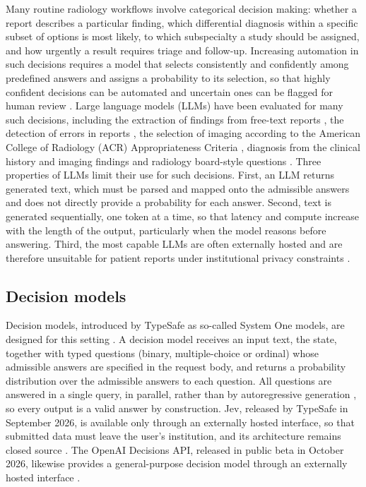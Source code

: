 \documentclass[11pt]{article}
\begin{document}
Many routine radiology workflows involve categorical decision making: whether a report describes a particular finding, which differential diagnosis within a specific subset of options is most likely, to which subspecialty a study should be assigned, and how urgently a result requires triage and follow-up. Increasing automation in such decisions requires a model that selects consistently and confidently among predefined answers and assigns a probability to its selection, so that highly confident decisions can be automated and uncertain ones can be flagged for human review \citep{geifman2017selective}. Large language models (LLMs) have been evaluated for many such decisions, including the extraction of findings from free-text reports \citep{fink2023datamining,mukherjee2023vicuna}, the detection of errors in reports \citep{gertz2024errors}, the selection of imaging according to the American College of Radiology (ACR) Appropriateness Criteria \citep{rau2023accgpt,yao2025radcases}, diagnosis from the clinical history and imaging findings \citep{ueda2023diagnosisplease,tayebiarasteh2025radiorag} and radiology board-style questions \citep{bhayana2023board}. Three properties of LLMs limit their use for such decisions. First, an LLM returns generated text, which must be parsed and mapped onto the admissible answers and does not directly provide a probability for each answer. Second, text is generated sequentially, one token at a time, so that latency and compute increase with the length of the output, particularly when the model reasons before answering. Third, the most capable LLMs are often externally hosted and are therefore unsuitable for patient reports under institutional privacy constraints \citep{mukherjee2023vicuna}.

\subsection{Decision models}\label{sec:intro_dm}

Decision models, introduced by TypeSafe as so-called System One models, are designed for this setting \citep{almeida2026jev}. A decision model receives an input text, the state, together with typed questions (binary, multiple-choice or ordinal) whose admissible answers are specified in the request body, and returns a probability distribution over the admissible answers to each question. All questions are answered in a single query, in parallel, rather than by autoregressive generation \citep{almeida2026jev,typesafe2026api}, so every output is a valid answer by construction. Jev, released by TypeSafe in September 2026, is available only through an externally hosted interface, so that submitted data must leave the user's institution, and its architecture remains closed source \citep{typesafe2026api,hume2026unmasked}. The OpenAI Decisions API, released in public beta in October 2026, likewise provides a general-purpose decision model through an externally hosted interface \citep{openai2026decisions}.
\end{document}
